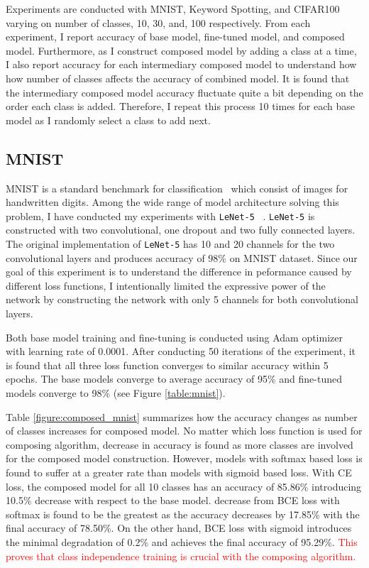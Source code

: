 \documentclass{article}
\newcommand{\red}[1]{\textcolor{red}{#1}}
\begin{document}
Experiments are conducted with MNIST, Keyword Spotting, and CIFAR100 varying on number of classes, 10, 30, and, 100 respectively. From each experiment, I report accuracy of base model, fine-tuned model, and composed model. Furthermore, as I construct composed model by adding a class at a time, I also report accuracy for each intermediary composed model to understand how how number of classes affects the accuracy of combined model. It is found that the intermediary composed model accuracy fluctuate quite a bit depending on the order each class is added. Therefore, I repeat this process 10 times for each base model as I randomly select a class to add next.

\subsection{MNIST}

MNIST is a standard benchmark for classification~\cite{lecun1998gradient} which consist of images for handwritten digits. Among the wide range of model architecture solving this problem, I have conducted my experiments with \texttt{LeNet-5} ~\cite{lecun2015lenet}. \texttt{LeNet-5} is constructed with two convolutional, one dropout and two fully connected layers. The original implementation of \texttt{LeNet-5} has 10 and 20 channels for the two convolutional layers and produces accuracy of 98\% on MNIST dataset. Since our goal of this experiment is to understand the difference in peformance caused by different loss functions, I intentionally limited the expressive power of the network by constructing the network with only 5 channels for both convolutional layers.

Both base model training and fine-tuning is conducted using Adam optimizer with learning rate of 0.0001. After conducting 50 iterations of the experiment, it is found that all three loss function converges to similar accuracy within 5 epochs. The base models converge to average accuracy of 95\% and fine-tuned models converge to 98\% (see Figure \ref{table:mnist}).

Table \ref{figure:composed_mnist} summarizes how the accuracy changes as number of classes increases for composed model. No matter which loss function is used for composing algorithm, decrease in accuracy is found as more classes are involved for the composed model construction. However, models with softmax based loss is found to suffer at a greater rate than models with sigmoid based loss. With CE loss, the composed model for all 10 classes has an accuracy of 85.86\% introducing 10.5\% decrease with respect to the base model. decrease from BCE loss with softmax is found to be the greatest as the accuracy decreases by 17.85\% with the final accuracy of 78.50\%. On the other hand, BCE loss with sigmoid introduces the minimal degradation of 0.2\% and achieves the final accuracy of 95.29\%. \red{This proves that class independence training is crucial with the composing algorithm.}
\end{document}
